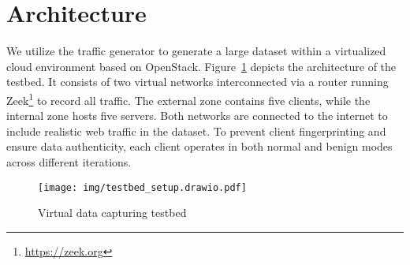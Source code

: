 \section{Architecture}
We utilize the traffic generator to generate a large dataset within a virtualized cloud environment based on OpenStack. Figure~\ref{fig:architecture} depicts the architecture of the testbed. It consists of two virtual networks interconnected via a router running Zeek\footnote{\url{https://zeek.org}} to record all traffic. The external zone contains five clients, while the internal zone hosts five servers. Both networks are connected to the internet to include realistic web traffic in the dataset. To prevent client fingerprinting and ensure data authenticity, each client operates in both normal and benign modes across different iterations.

\begin{figure}
    \centering
    \texttt{[image: img/testbed\_setup.drawio.pdf]}
    \caption{Virtual data capturing testbed}
    \label{fig:architecture}
\end{figure}